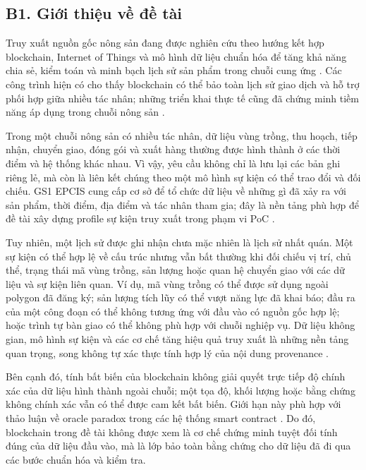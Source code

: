 \documentclass[letterpaper,11pt]{article}
\begin{document}
\subsection*{B1. Giới thiệu về đề tài}
Truy xuất nguồn gốc nông sản đang được nghiên cứu theo hướng kết hợp blockchain, Internet of Things và mô hình dữ liệu chuẩn hóa để tăng khả năng chia sẻ, kiểm toán và minh bạch lịch sử sản phẩm trong chuỗi cung ứng \cite{ahmad2021,ellahi2023,shahid2020,caro2018,pranto2021}. Các công trình hiện có cho thấy blockchain có thể bảo toàn lịch sử giao dịch và hỗ trợ phối hợp giữa nhiều tác nhân; những triển khai thực tế cũng đã chứng minh tiềm năng áp dụng trong chuỗi nông sản \cite{shahid2020,caro2018,spitalleri2023}.

Trong một chuỗi nông sản có nhiều tác nhân, dữ liệu vùng trồng, thu hoạch, tiếp nhận, chuyển giao, đóng gói và xuất hàng thường được hình thành ở các thời điểm và hệ thống khác nhau. Vì vậy, yêu cầu không chỉ là lưu lại các bản ghi riêng lẻ, mà còn là liên kết chúng theo một mô hình sự kiện có thể trao đổi và đối chiếu. GS1 EPCIS cung cấp cơ sở để tổ chức dữ liệu về những gì đã xảy ra với sản phẩm, thời điểm, địa điểm và tác nhân tham gia; đây là nền tảng phù hợp để đề tài xây dựng profile sự kiện truy xuất trong phạm vi PoC \cite{ahn2023}.

Tuy nhiên, một lịch sử được ghi nhận chưa mặc nhiên là lịch sử nhất quán. Một sự kiện có thể hợp lệ về cấu trúc nhưng vẫn bất thường khi đối chiếu vị trí, chủ thể, trạng thái mã vùng trồng, sản lượng hoặc quan hệ chuyển giao với các dữ liệu và sự kiện liên quan. Ví dụ, mã vùng trồng có thể được sử dụng ngoài polygon đã đăng ký; sản lượng tích lũy có thể vượt năng lực đã khai báo; đầu ra của một công đoạn có thể không tương ứng với đầu vào có nguồn gốc hợp lệ; hoặc trình tự bàn giao có thể không phù hợp với chuỗi nghiệp vụ. Dữ liệu không gian, mô hình sự kiện và các cơ chế tăng hiệu quả truy xuất là những nền tảng quan trọng, song không tự xác thực tính hợp lý của nội dung provenance \cite{ahn2023,miloudi2019,wu2023}.

Bên cạnh đó, tính bất biến của blockchain không giải quyết trực tiếp độ chính xác của dữ liệu hình thành ngoài chuỗi; một tọa độ, khối lượng hoặc bằng chứng không chính xác vẫn có thể được cam kết bất biến. Giới hạn này phù hợp với thảo luận về oracle paradox trong các hệ thống smart contract \cite{albizri2021}. Do đó, blockchain trong đề tài không được xem là cơ chế chứng minh tuyệt đối tính đúng của dữ liệu đầu vào, mà là lớp bảo toàn bằng chứng cho dữ liệu đã đi qua các bước chuẩn hóa và kiểm tra.
\end{document}
